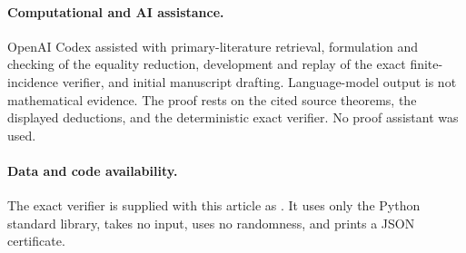 \documentclass[11pt]{article}
\begin{document}
\paragraph{Computational and AI assistance.}
OpenAI Codex assisted with primary-literature retrieval, formulation and
checking of the equality reduction, development and replay of the exact
finite-incidence verifier, and initial manuscript drafting.  Language-model
output is not mathematical evidence.  The proof rests on the cited source
theorems, the displayed deductions, and the deterministic exact verifier.
No proof assistant was used.

\paragraph{Data and code availability.}
The exact verifier is supplied with this article as
.  It uses only the Python standard
library, takes no input, uses no randomness, and prints a JSON certificate.



\end{document}
